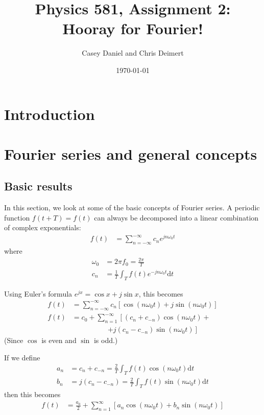\documentclass[twocolumn]{myarticle}
\renewcommand{\d}{\mathrm{d}}
\begin{document}
\title{Physics 581, Assignment 2:\\Hooray for Fourier!}
\author{Casey Daniel and Chris Deimert}
\date{\today}

\maketitle

\section{Introduction}
\label{sec:introduction}

\section{Fourier series and general concepts}
\label{sec:fourier_series_and_general_concepts}

\subsection{Basic results}
\label{subsec:basic_results}

In this section, we look at some of the basic concepts of Fourier series.
A periodic function $ f(t+T) = f(t) $ can always be decomposed into a linear combination of complex exponentials:
\begin{align}
    f(t) &= \sum_{n = -\infty}^{-\infty} c_n e^{j n \omega_0 t}
\end{align}
where
\begin{align}
    \omega_0 &= 2 \pi f_0 =  \frac{2 \pi}{T}
    \\
    c_n &= \frac{1}{T} \int_{T} f(t) e^{-j n \omega_0 t} \d t
\end{align}

Using Euler's formula $ e^{jx} = \cos x + j \sin x $, this becomes
\begin{align}
    f(t) &= \sum_{n = -\infty}^{-\infty} c_n \left[ \cos (n \omega_0 t) + j \sin (n \omega_0 t) \right]
    \\
    f(t) &= c_0 + \sum_{n = 1}^{-\infty} \left[ (c_n + c_{-n}) \cos (n \omega_0 t) + \right.
    \nonumber \\
    &\qquad \qquad \quad \left. + j (c_n - c_{-n}) \sin (n \omega_0 t) \right]
\end{align}
(Since $ \cos $ is even and $ \sin $ is odd.)

If we define
\begin{align}
    a_n &= c_n + c_{-n} = \frac{2}{T} \int_{T} f(t) \cos(n \omega_0 t) \d t \label{eq:a_n_def}
    \\
    b_n &= j(c_n - c_{-n}) = \frac{2}{T} \int_{T} f(t) \sin(n \omega_0 t) \d t \label{eq:b_n_def}
\end{align}
then this becomes
\begin{align}
    f(t) &= \frac{a_0}{2} + \sum_{n = 1}^{\infty} \left[ a_n \cos (n \omega_0 t) + b_n \sin (n \omega_0 t) \right]
\end{align}
\end{document}
